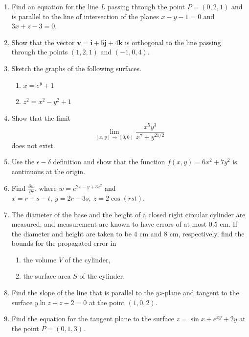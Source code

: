 \documentclass[a4paper, 12pt]{article}
\begin{document}
\begin{enumerate}[leftmargin=*,label=\textbf{\arabic*.}]
\item Find an equation for the line $L$ passing through the point $P=(0,2,1)$ and is parallel to the line of intersection of the planes $x-y-1=0$ and $3x+z-3=0$.

\item Show that the vector $\mathbf{v}=\mathbf{i}+5\mathbf{j}+4\mathbf{k}$ is orthogonal to the line passing through the points $(1,2,1)$ and $(-1,0,4)$.

\item Sketch the graphs of the following surfaces.
\begin{enumerate}[leftmargin=*,label=\textbf{\alph*.}]
\item $x={e}^y+1$
\item $z^2=x^2-y^2+1$
\end{enumerate}

\item Show that the limit
\[\lim_{(x,y)\to(0,0)}\frac{x^5y^3}{x^7+y^{21/2}}\]
does not exist.

\item Use the $\epsilon-\delta$ definition and show that the function $f(x,y)=6x^2+7y^2$ is continuous at the origin.

\item Find $\displaystyle\frac{\partial w}{\partial r}$, where $w={e}^{2x-y+3z^2}$ and $x=r+s-t,\:y=2r-3s,\:z=2\cos(rst)$.

\item The diameter of the base and the height of a closed right circular cylinder are measured, and measurement are known to have errors of at most $0.5$ cm. If the diameter and height are taken to be $4$ cm and $8$ cm, respectively, find the bounds for the propagated error in
\begin{enumerate}[leftmargin=*,label=\textbf{\alph*.}]
\item the volume $V$ of the cylinder,
\item the surface area $S$ of the cylinder.
\end{enumerate}

\item Find the slope of the line that is parallel to the $yz$-plane and tangent to the surface $y\ln z+z-2=0$ at the point $(1,0,2)$.

\item Find the equation for the tangent plane to the surface $z=\sin x+{e}^{xy}+2y$ at the point $P=(0,1,3)$.
\end{enumerate}
\end{document}
